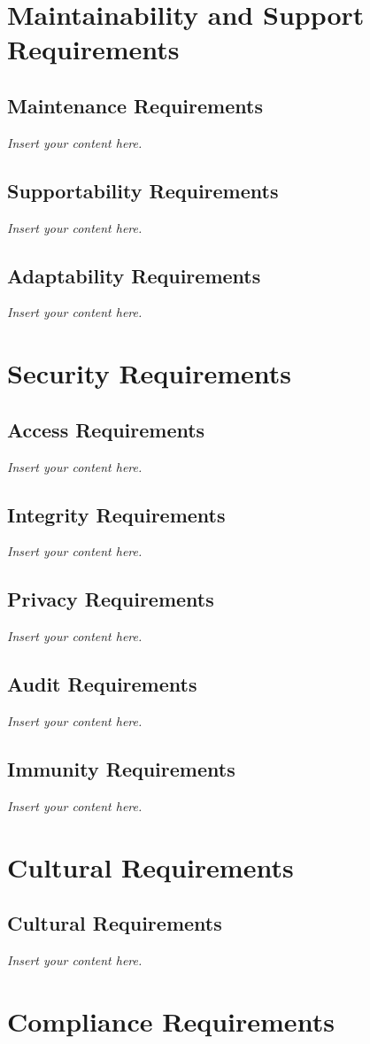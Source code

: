 \documentclass[12pt]{article}
\newcommand{\lips}{\textit{Insert your content here.}}
\begin{document}
\section{Maintainability and Support Requirements}
\subsection{Maintenance Requirements}
\lips
\subsection{Supportability Requirements}
\lips
\subsection{Adaptability Requirements}
\lips

\section{Security Requirements}
\subsection{Access Requirements}
\lips
\subsection{Integrity Requirements}
\lips
\subsection{Privacy Requirements}
\lips
\subsection{Audit Requirements}
\lips
\subsection{Immunity Requirements}
\lips

\section{Cultural Requirements}
\subsection{Cultural Requirements}
\lips

\section{Compliance Requirements}
\end{document}
